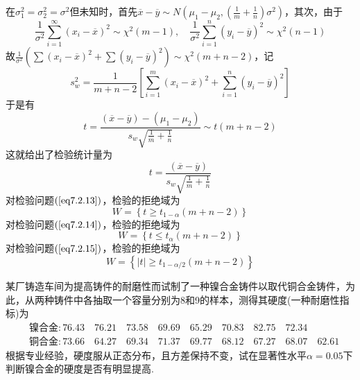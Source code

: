 在$\sigma _ { 1 } ^ { 2 } = \sigma _ { 2 } ^ { 2 } = \sigma ^ { 2 }$但未知时，首先$\overline { x } - \overline { y } \sim N \left( \mu _ { 1 } - \mu _ { 2 } , \left( \frac { 1 } { m } + \frac { 1 } { n } \right) \sigma ^ { 2 } \right)$，其次，由于
\[\frac { 1 } { \sigma ^ { 2 } } \sum _ { i = 1 } ^ { \infty } \left( x _ { i } - \overline { x } \right) ^ { 2 } \sim \chi ^ { 2 } ( m - 1 ) , \quad \frac { 1 } { \sigma ^ { 2 } } \sum _ { i = 1 } ^ { n } \left( y _ { i } - \overline { y } \right) ^ { 2 } \sim \chi ^ { 2 } ( n - 1 )\]
故$\frac { 1 } { \sigma ^ { 2 } } \left( \sum \left( x _ { i } - \overline { x } \right) ^ { 2 } + \sum \left( y _ { i } - \overline { y } \right) ^ { 2 } \right) \sim \chi ^ { 2 } ( m + n - 2 )$，记
\[s _ { w } ^ { 2 } = \frac { 1 } { m + n - 2 } \left[ \sum _ { i = 1 } ^ { m } \left( x _ { i } - \overline { x } \right) ^ { 2 } + \sum _ { i = 1 } ^ { n } \left( y _ { i } - \overline { y } \right) ^ { 2 } \right]\]
于是有
\[t = \frac { ( \overline { x } - \overline { y } ) - \left( \mu _ { 1 } - \mu _ { 2 } \right) } { s _ { w } \sqrt { \frac { 1 } { m } + \frac { 1 } { n } } } \sim t ( m + n - 2 )\]
这就给出了检验统计量为
\[t = \frac { ( \overline { x } - \overline { y } ) } { s _ { w } \sqrt { \frac { 1 } { m } + \frac { 1 } { n } } }\]
对检验问题$(\ref{eq7.2.13})$，检验的拒绝域为
\begin{equation}\label{eq7.2.19}
W=\left\{t\geq t_{1-\alpha}\left(m+n-2\right)\right\}
\end{equation}
对检验问题$(\ref{eq7.2.14})$，检验的拒绝域为
\begin{equation}\label{eq7.2.20}
W=\left\{t\leq t_{\alpha}\left(m+n-2\right)\right\}
\end{equation}
对检验问题$(\ref{eq7.2.15})$，检验的拒绝域为
\begin{equation}\label{eq7.2.21}
W = \left\{ | t | \geq t _ { 1 - \alpha/ 2 } ( m + n - 2 ) \right\}
\end{equation}
\begin{example}\label{exam7.2.3}
	某厂铸造车间为提高铸件的耐磨性而试制了一种镍合金铸件以取代铜合金铸件，为此，从两种铸件中各抽取一个容量分别为8和9的样本，测得其硬度(一种耐磨性指标)为
	\begin{align*}
	&\text{镍合金}:76.43 \quad 76.21 \quad 73.58 \quad 69.69 \quad 65.29 \quad 70.83 \quad 82.75 \quad 72.34\\
	&\text{铜合金}:73.66 \quad 64.27 \quad 69.34 \quad 71.37 \quad 69.77 \quad 68.12 \quad 67.27 \quad 68.07 \quad 62.61
	\end{align*}
	根据专业经验，硬度服从正态分布，且方差保持不变，试在显著性水平$\alpha=0.05$下判断镍合金的硬度是否有明显提高.
\end{example}

